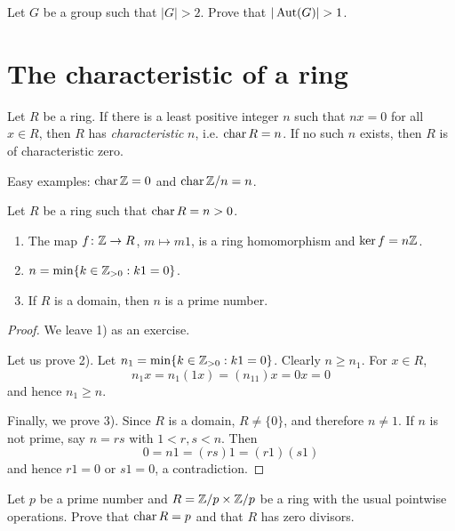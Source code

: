 \begin{bonus}
\label{xca:aut}
    Let $G$ be a group such that $|G|>2$. Prove that $|\Aut(G)|>1$.
\end{bonus}

\section{The characteristic of a ring}

\begin{definition}
Let $R$ be a ring. If there is a least positive integer $n$ such that 
$nx=0$ for all $x\in R$, then $R$ has \emph{characteristic} $n$, i.e. $\operatorname{char} R=n$. If no such $n$ exists, 
then $R$ is of characteristic zero. 
\end{definition}

Easy examples: $\operatorname{char}\mathbb{Z}=0$ and $\operatorname{char}\mathbb{Z}/n=n$.

\begin{proposition}
    Let $R$ be a ring such that $\operatorname{char} R=n>0$.
    \begin{enumerate}
        \item The map $f\colon \mathbb{Z}\to R$, $m\mapsto m1$, is a ring homomorphism and $\ker f=n\mathbb{Z}$.  
        \item $n=\min\{k\in\mathbb{Z}_{>0}:k1=0\}$.
        \item If $R$ is a domain, then $n$ is a prime number.
    \end{enumerate}
\end{proposition}

\begin{proof}
    We leave 1) as an exercise. 
    
    Let us prove 2). Let $n_1=\min\{k\in\mathbb{Z}_{>0}:k1=0\}$. Clearly 
    $n\geq n_1$. For $x\in R$,
    \[ 
    n_1x=n_1(1x)=(n_11)x=0x=0
    \]
    and hence $n_1\geq n$. 
    
    Finally, we prove 3). 
    Since $R$ is a domain, $R\ne\{0\}$, and
    therefore $n\ne1$. 
    If $n$ is not prime, say
    $n=rs$ with $1<r,s<n$. Then 
    \[
    0=n1=(rs)1=(r1)(s1)
    \]
    and hence $r1=0$ or $s1=0$, a contradiction. 
\end{proof}

\begin{exercise}
    Let $p$ be a prime number and 
    $R=\mathbb{Z}/p\times\mathbb{Z}/p$ be a ring with the usual pointwise operations. 
    Prove that $\operatorname{char} R=p$ and that $R$ has zero divisors. 
\end{exercise}

